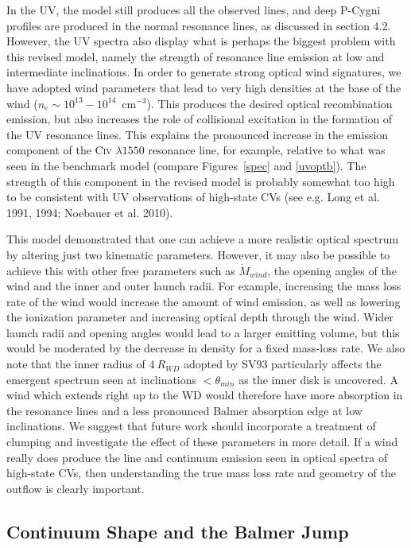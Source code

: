 \documentclass[preprint, a4paper, 11pt]{aastex}
\begin{document}
In the UV, the model still produces all the observed lines, 
and deep P-Cygni profiles are produced in the normal resonance lines,
as discussed in section 4.2. However, the UV spectra also
display what is perhaps the biggest problem with this revised model,
namely the strength of resonance line emission 
at low and intermediate inclinations.
In order to generate strong optical wind signatures, we have adopted wind
parameters that lead to very high densities at the base of the wind
($n_e\sim10^{13}-10^{14}$~cm$^{-3}$). This produces
the desired optical recombination emission, but also increases the
role of collisional excitation in the formation of the UV resonance
lines. This explains the pronounced increase in the emission component 
of the C\textsc{iv} $\lambda1550$ resonance line, for example, relative to
what was seen in the benchmark model (compare Figures~\ref{spec} and
\ref{uvoptb}). The strength of this component in the revised model 
is probably somewhat too high to be consistent with UV observations 
of high-state CVs (see e.g. Long et al. 1991, 1994; Noebauer et al. 2010).
\nocite{long1991,long1994, noebauer}

This model demonstrated that one can achieve a more
realistic optical spectrum by altering just two kinematic parameters. 
However, it may also be possible to achieve this with
other free parameters such as $\dot{M}_{wind}$, the opening angles of the wind and the 
inner and outer launch radii. For example, increasing the mass loss rate of the wind
would increase the amount of wind emission, as well as lowering the ionization 
parameter and increasing optical depth through the wind. 
Wider launch radii and opening angles would lead to a larger emitting volume, but
this would be moderated by the decrease in density for a fixed mass-loss rate. 
We also note that the inner radius of $4~R_{WD}$ adopted by SV93 
particularly affects the emergent spectrum seen at inclinations $<\theta_{min}$ as 
the inner disk is uncovered. A wind which extends right up to the WD would therefore
have more absorption in the resonance lines and a less pronounced Balmer absorption edge
at low inclinations. We suggest that future work should incorporate a treatment of clumping
and investigate the effect of these parameters in more detail. If a wind 
really does produce the line and continuum emission seen in optical spectra of high-state CVs, then
understanding the true mass loss rate and geometry of the outflow is clearly important.



\subsection{Continuum Shape and the Balmer Jump}
\end{document}
